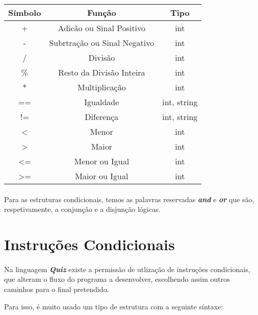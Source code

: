 \documentclass{report}
\begin{document}
\begin{center}
\begin{tabular}{| c | c | c |}
	\hline
	\textbf{Símbolo} & \textbf{Função} 		& \textbf{Tipo} \\
	\hline
	+ 	    & Adicão ou Sinal Positivo 		& int \\
	-		& Subrtração ou Sinal Negativo	& int \\
	/		& Divisão						& int \\
	\%		& Resto da Divisão Inteira		& int \\
	*		& Multiplicação					& int \\
	== 		& Igualdade						& int, string \\
	!=		& Diferença						& int, string \\
	<		& Menor							& int \\
	>		& Maior							& int \\
	<=		& Menor ou Igual				& int \\
	>=		& Maior ou Igual				& int \\	
	\hline
\end{tabular}
\end{center}

\paragraph{}

Para as estruturas condicionais, temos as palavras reservadas \textbf{\textit{and}} e \textbf{\textit{or}} que são, respetivamente, a conjunção e a disjunção lógicas.



\section{Instruções Condicionais}

\paragraph{}

Na linguagem \textbf{\textit{Quiz}} existe a permissão de utlização de instruções condicionais, que alteram o fluxo do programa a desenvolver, escolhendo assim outros caminhos para o final pretendido.

Para isso, é muito usado um tipo de estrutura com a seguinte síntaxe:
\end{document}
